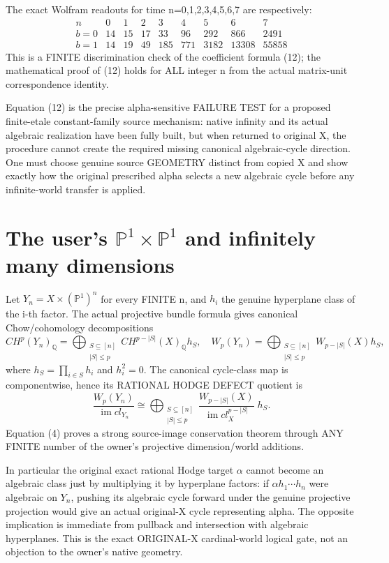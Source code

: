 \documentclass[11pt]{article}
\begin{document}
The exact Wolfram readouts for
time n=0,1,2,3,4,5,6,7 are respectively:
\[
\begin{array}{c|rrrrrrrr}
n&0&1&2&3&4&5&6&7\\\hline
b=0&14&15&17&33&96&292&866&2491\\
b=1&14&19&49&185&771&3182&13308&55858
\end{array}
\]
This is a FINITE discrimination check
of the coefficient formula (12);
the mathematical proof of (12) holds
for ALL integer n from the actual
matrix-unit correspondence identity.

Equation (12) is the precise
alpha-sensitive FAILURE TEST for
a proposed finite-etale constant-family
source mechanism: native infinity
and its actual algebraic realization
have been fully built, but when
returned to original X, the procedure
cannot create the required missing
canonical algebraic-cycle direction.
One must choose genuine source
GEOMETRY distinct from copied X
and show exactly how the original
prescribed alpha selects a new
algebraic cycle before any
infinite-world transfer is applied.

\section{The user's \(\mathbb P^1\times\mathbb P^1\) and infinitely many dimensions}
Let \(Y_n=X\times(\mathbb P^1)^n\) for
every FINITE n, and \(h_i\) the genuine
hyperplane class of the i-th factor.
The actual projective bundle formula
gives canonical Chow/cohomology
decompositions
\[
CH^p(Y_n)_{\mathbb Q}
=\bigoplus_{\substack{S\subseteq[n]\\|S|\le p}}
CH^{p-|S|}(X)_{\mathbb Q}h_S,
\quad
W_p(Y_n)=
\bigoplus_{\substack{S\subseteq[n]\\|S|\le p}}
W_{p-|S|}(X)h_S,
\]
where \(h_S=\prod_{i\in S}h_i\) and
\(h_i^2=0\).
The canonical cycle-class map is componentwise,
hence its RATIONAL HODGE DEFECT quotient is
\[
\boxed{
\frac{W_p(Y_n)}{\operatorname{im}cl_{Y_n}}
\cong
\bigoplus_{\substack{S\subseteq[n]\\|S|\le p}}
\frac{W_{p-|S|}(X)}
     {\operatorname{im}cl_X^{p-|S|}}\;h_S.
}\tag{4}
\]
Equation (4) proves a strong source-image
conservation theorem through ANY FINITE
number of the owner's projective
dimension/world additions.

In particular the original exact rational
Hodge target \(\alpha\) cannot become an
algebraic class just by multiplying it
by hyperplane factors:
if \(\alpha h_1\cdots h_n\) were algebraic
on \(Y_n\), pushing its algebraic cycle
forward under the genuine projective
projection would give an actual original-X
cycle representing alpha.
The opposite implication is immediate
from pullback and intersection with
algebraic hyperplanes.
This is the exact ORIGINAL-X cardinal-world
logical gate, not an objection to
the owner's native geometry.
\end{document}
